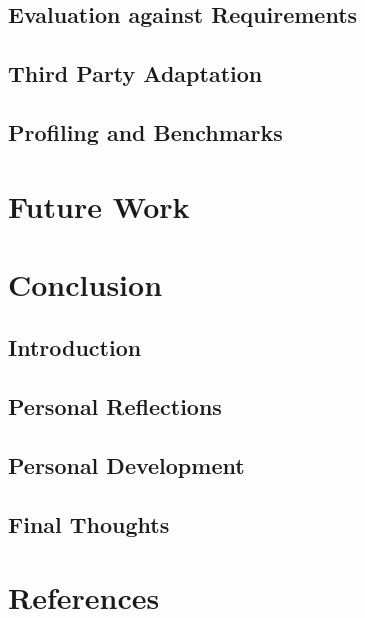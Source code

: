 \documentclass[12pt, a4paper]{article}
\begin{document}

\subsection{Evaluation against Requirements}


\subsection{Third Party Adaptation}


\subsection{Profiling and Benchmarks}


\section{Future Work}


\section{Conclusion}


\subsection{Introduction}


\subsection{Personal Reflections}


\subsection{Personal Development}


\subsection{Final Thoughts}

\pagebreak


\section{References}


\end{document}
